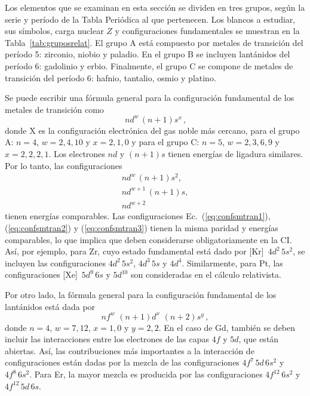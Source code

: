 Los elementos que se examinan en esta sección se dividen en tres grupos, 
según la serie y período de la Tabla Periódica al que pertenecen. Los 
blancos a estudiar, sus símbolos, carga nuclear $Z$ y configuraciones 
fundamentales se muestran en la Tabla~\ref{tab:gruposrelat}. El grupo A
está compuesto por metales de transición del período 5: zirconio, niobio
y paladio. En el grupo B se incluyen lantánidos del período 6: 
gadolinio y erbio. Finalmente, el grupo C se compone de metales de 
transición del período 6: hafnio, tantalio, osmio y platino.

Se puede escribir una fórmula general para la configuración fundamental 
de los metales de transición como
\begin{equation}
[\text{X}]\,nd^w\,(n+1)s^x\,,
\end{equation}
donde X es la configuración electrónica del gas noble más cercano, para 
el grupo A: $n=4$, $w=2,4,10$ y $x=2,1,0$ y para el grupo C: $n=5$, 
$w=2,3,6,9$ y $x=2,2,2,1$. Los electrones $nd$ y $(n+1)s$ tienen 
energías de ligadura similares. Por lo tanto, las configuraciones 
\begin{gather}
nd^w\,(n+1)s^2,
\label{eq:confsmtran1} \\
nd^{w+1}\,(n+1)s,
\label{eq:confsmtran2} \\
nd^{w+2}
\label{eq:confsmtran3}
\end{gather}
tienen energías comparables. Las configuraciones 
Ec.~(\ref{eq:confsmtran1}), (\ref{eq:confsmtran2}) y 
(\ref{eq:confsmtran3}) tienen la misma paridad y energías comparables, 
lo que implica que deben considerarse obligatoriamente en la CI.
Así, por ejemplo, para Zr, cuyo estado fundamental está dado por 
[Kr]~$4d^2\,5s^2$, se incluyen las configuraciones $4d^2\,5s^2$, 
$4d^3\,5s$ y $4d^4$. Similarmente, para Pt, las configuraciones 
[Xe]~$5d^9\,6s$ y $5d^{10}$ son consideradas en el cálculo relativista.

Por otro lado, la fórmula general para la configuración fundamental de 
los lantánidos está dada por
\begin{equation}
nf^w\,\,(n+1)d^x\,\,(n+2)s^y\,,
\end{equation}
donde $n=4$, $w=7,12$, $x=1,0$ y $y=2,2$. En el caso de Gd, también 
se deben incluir las interacciones entre los electrones de las capas
$4f$ y $5d$, que están abiertas. Así, las contribuciones más 
importantes a la interacción de configuraciones están dadas por la 
mezcla de las configuraciones $4f^7\,5d\,6s^2$ y $4f^8\,6s^2$.
Para Er, la mayor mezcla es producida por las configuraciones 
$4f^{12}\,6s^2$ y $4f^{12}\,5d\,6s$.

